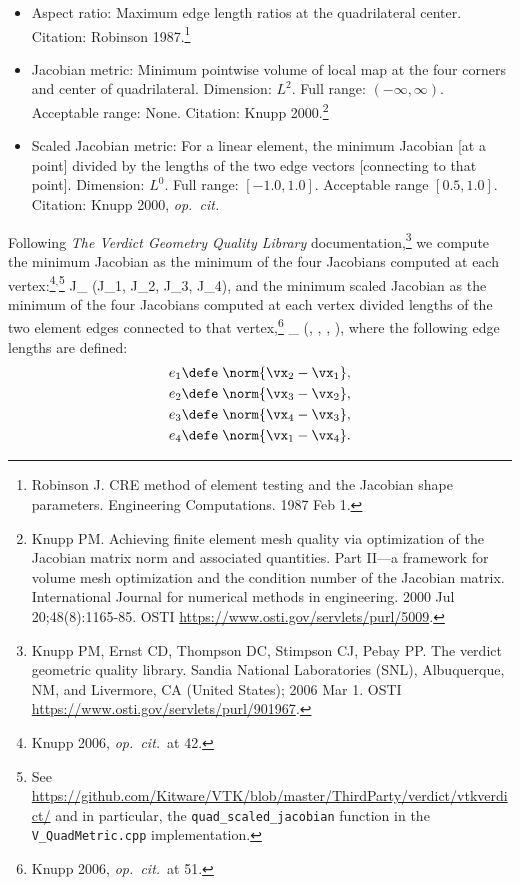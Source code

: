\documentclass[14pt,letterpaper,fleqn]{extreport}
\begin{document}
\begin{itemize}
    \item Aspect ratio: Maximum edge length ratios at the quadrilateral center.  Citation: Robinson 1987.\footnote{Robinson J. CRE method of element testing and the Jacobian shape parameters. Engineering Computations. 1987 Feb 1.}
  \item Jacobian metric: Minimum pointwise volume of local map at the four corners and center of quadrilateral.  Dimension: $L^2$.  Full range: $(-\infty, \infty)$.  Acceptable range: None.  Citation: Knupp 2000.\footnote{Knupp PM. Achieving finite element mesh quality via optimization of the Jacobian matrix norm and associated quantities. Part II—a framework for volume mesh optimization and the condition number of the Jacobian matrix. International Journal for numerical methods in engineering. 2000 Jul 20;48(8):1165-85. OSTI \href{link}{https://www.osti.gov/servlets/purl/5009}.}%
  \item Scaled Jacobian metric: For a linear element, the minimum Jacobian [at a point] divided by the lengths of the two edge vectors [connecting to that point].  Dimension: $L^0$.  Full range: $[-1.0, 1.0]$.  Acceptable range $[0.5, 1.0]$.  Citation: Knupp 2000, {\em op.~cit.}
\end{itemize}

Following {\em The Verdict Geometry Quality 
Library} documentation,\footnote{Knupp PM, Ernst CD, Thompson DC, Stimpson CJ, Pebay PP. 
The verdict geometric quality library. Sandia National Laboratories (SNL), 
Albuquerque, NM, and Livermore, CA (United States); 2006 Mar 1.  
OSTI \href{link}{https://www.osti.gov/servlets/purl/901967}.} 
we compute the minimum Jacobian as the minimum of the four Jacobians computed 
at each vertex:\footnote{Knupp 2006, {\em op.~cit.}~at 
42.}$^{,}$\footnote{See 
\href{link}{https://github.com/Kitware/VTK/blob/master/ThirdParty/verdict/vtkverdict/}
and in particular, the {\tt quad\_scaled\_jacobian} function in the {\tt V\_QuadMetric.cpp} implementation.}%
\be 
J_{\min}  \min(J_1, J_2, J_3, J_4),
\ee 
and the minimum scaled Jacobian as the minimum of the four Jacobians computed at 
each vertex divided lengths of the two element edges connected 
to that vertex,\footnote{Knupp 2006, {\em op.~cit.}~at 51.}
\be 
{}_{\min}  \min\left(, , 
, \right),
\ee 
where the following edge lengths are defined:
\begin{align}
e_1 &\defe \; \norm{\vx_2 - \vx_1}, \\
e_2 &\defe \; \norm{\vx_3 - \vx_2}, \\
e_3 &\defe \; \norm{\vx_4 - \vx_3}, \\
e_4 &\defe \; \norm{\vx_1 - \vx_4}.
\end{align}
\end{document}
